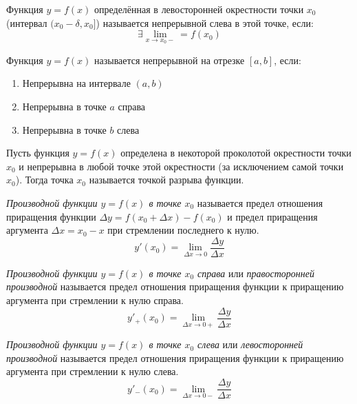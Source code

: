 \begin{definition}
    Функция $y = f(x)$ определённая в левосторонней окрестности точки $x_0$ (интервал $(x_0 - \delta, x_0]$) называется непрерывной слева в этой точке, если: \[
        \exists \lim_{x \to x_0-} = f(x_0)
    \] 
\end{definition}


\begin{definition} \label{def:55}
    Функция $y = f(x) $ называется непрерывной на отрезке $[a, b]$, если:
    \begin{enumerate}
        \item Непрерывна на интервале $(a, b)$
        \item Непрерывна в точке $a$ справа
        \item Непрерывна в точке $b$ слева
    \end{enumerate}
\end{definition}


\begin{definition} \label{def:56}
    Пусть функция $y = f(x)$ определена в некоторой проколотой окрестности точки $x_0$ и непрерывна в любой точке этой окрестности (за исключением самой точки $x_0$).
    Тогда точка $x_0$ называется точкой разрыва функции.
\end{definition}


\begin{definition} \label{def:61}
    \textit{Производной функции $y = f(x)$ в точке $x_0$ } называется предел отношения приращения функции $\Delta y = f(x_0 + \Delta x) - f(x_0)$ и предел приращения аргумента $\Delta x = x_0 - x$  при стремлении последнего к нулю. \[
        y'(x_0) = \lim_{\Delta x \to 0} \frac{\Delta y}{\Delta x}
    \]
\end{definition}


\begin{definition} \label{def:62}
    \textit{Производной функции $y=f(x)$ в точке $x_0$ справа} или \textit{правосторонней производной} называется предел отношения приращения функции к приращению аргумента при стремлении к нулю справа. \[
        y'_+(x_0) = \lim_{\Delta x \to 0+} \frac{\Delta y}{\Delta x}
    \] 
\end{definition}


\begin{definition} \label{def:63}
    \textit{Производной функции $y=f(x)$ в точке $x_0$ слева} или \textit{левосторонней производной} называется предел отношения приращения функции к приращению аргумента при стремлении к нулю слева. \[
        y'_-(x_0) = \lim_{\Delta x \to 0-} \frac{\Delta y}{\Delta x}
    \] 
\end{definition}


